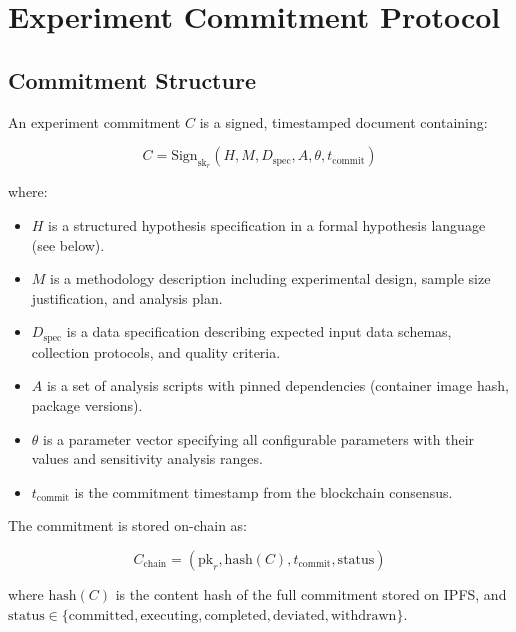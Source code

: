 \documentclass[11pt,a4paper]{article}
\begin{document}
\section{Experiment Commitment Protocol}
\label{sec:commitments}

\subsection{Commitment Structure}

An experiment commitment $C$ is a signed, timestamped document containing:

\begin{equation}
    C = \text{Sign}_{\text{sk}_r}\left(H, M, D_{\text{spec}}, A, \theta, t_{\text{commit}}\right)
\end{equation}

\noindent where:
\begin{itemize}[leftmargin=*]
    \item $H$ is a structured hypothesis specification in a formal hypothesis language (see below).
    \item $M$ is a methodology description including experimental design, sample size justification, and analysis plan.
    \item $D_{\text{spec}}$ is a data specification describing expected input data schemas, collection protocols, and quality criteria.
    \item $A$ is a set of analysis scripts with pinned dependencies (container image hash, package versions).
    \item $\theta$ is a parameter vector specifying all configurable parameters with their values and sensitivity analysis ranges.
    \item $t_{\text{commit}}$ is the commitment timestamp from the blockchain consensus.
\end{itemize}

The commitment is stored on-chain as:

\begin{equation}
    C_{\text{chain}} = (\text{pk}_r, \text{hash}(C), t_{\text{commit}}, \text{status})
\end{equation}

\noindent where $\text{hash}(C)$ is the content hash of the full commitment stored on IPFS, and $\text{status} \in \{\text{committed}, \text{executing}, \text{completed}, \text{deviated}, \text{withdrawn}\}$.
\end{document}
